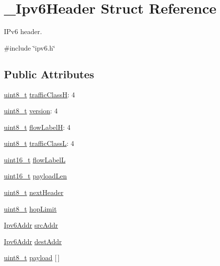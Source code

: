 \hypertarget{struct__Ipv6Header}{}\section{\+\_\+\+Ipv6\+Header Struct Reference}
\label{struct__Ipv6Header}


I\+Pv6 header.  




{\ttfamily \#include \char`\"{}ipv6.\+h\char`\"{}}

\subsection*{Public Attributes}
\begin{DoxyCompactItemize}
\item 
\hyperlink{stdint_8h_aba7bc1797add20fe3efdf37ced1182c5}{uint8\+\_\+t} \hyperlink{struct__Ipv6Header_a6f4116e9ac636281c9f9c1126ce32a2b}{traffic\+ClassH}\+: 4
\item 
\hyperlink{stdint_8h_aba7bc1797add20fe3efdf37ced1182c5}{uint8\+\_\+t} \hyperlink{struct__Ipv6Header_a19faa8b7188c15c19505913395c55de5}{version}\+: 4
\item 
\hyperlink{stdint_8h_aba7bc1797add20fe3efdf37ced1182c5}{uint8\+\_\+t} \hyperlink{struct__Ipv6Header_adf6f740f5886b69780307b65dd820b69}{flow\+LabelH}\+: 4
\item 
\hyperlink{stdint_8h_aba7bc1797add20fe3efdf37ced1182c5}{uint8\+\_\+t} \hyperlink{struct__Ipv6Header_ac61d4c4fd52f4d1c176d6b5410be6f70}{traffic\+ClassL}\+: 4
\item 
\hyperlink{stdint_8h_a273cf69d639a59973b6019625df33e30}{uint16\+\_\+t} \hyperlink{struct__Ipv6Header_aee825a8e47e4188c0e52fc501bd62d8f}{flow\+LabelL}
\item 
\hyperlink{stdint_8h_a273cf69d639a59973b6019625df33e30}{uint16\+\_\+t} \hyperlink{struct__Ipv6Header_a8966ff7039b8c7c18cb69bcdac478a6a}{payload\+Len}
\item 
\hyperlink{stdint_8h_aba7bc1797add20fe3efdf37ced1182c5}{uint8\+\_\+t} \hyperlink{struct__Ipv6Header_ae290a2f4bfb2e71c34f65c572191f348}{next\+Header}
\item 
\hyperlink{stdint_8h_aba7bc1797add20fe3efdf37ced1182c5}{uint8\+\_\+t} \hyperlink{struct__Ipv6Header_ae7bb526f594d326a50f49577156c99f1}{hop\+Limit}
\item 
\hyperlink{ipv6_8h_aed0cbc40c61ed5b4fb681ebc55237e89}{Ipv6\+Addr} \hyperlink{struct__Ipv6Header_aefa2890bda23486ff09f625bd6fd1092}{src\+Addr}
\item 
\hyperlink{ipv6_8h_aed0cbc40c61ed5b4fb681ebc55237e89}{Ipv6\+Addr} \hyperlink{struct__Ipv6Header_ab0549c93e9ce542f3edd652e812ddfef}{dest\+Addr}
\item 
\hyperlink{stdint_8h_aba7bc1797add20fe3efdf37ced1182c5}{uint8\+\_\+t} \hyperlink{struct__Ipv6Header_a45355cc11f1030193c3d57eeaa5ff015}{payload} \mbox{[}$\,$\mbox{]}
\end{DoxyCompactItemize}


